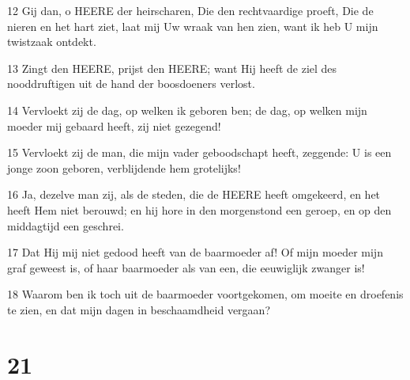 \par 12 Gij dan, o HEERE der heirscharen, Die den rechtvaardige proeft, Die de nieren en het hart ziet, laat mij Uw wraak van hen zien, want ik heb U mijn twistzaak ontdekt.
\par 13 Zingt den HEERE, prijst den HEERE; want Hij heeft de ziel des nooddruftigen uit de hand der boosdoeners verlost.
\par 14 Vervloekt zij de dag, op welken ik geboren ben; de dag, op welken mijn moeder mij gebaard heeft, zij niet gezegend!
\par 15 Vervloekt zij de man, die mijn vader geboodschapt heeft, zeggende: U is een jonge zoon geboren, verblijdende hem grotelijks!
\par 16 Ja, dezelve man zij, als de steden, die de HEERE heeft omgekeerd, en het heeft Hem niet berouwd; en hij hore in den morgenstond een geroep, en op den middagtijd een geschrei.
\par 17 Dat Hij mij niet gedood heeft van de baarmoeder af! Of mijn moeder mijn graf geweest is, of haar baarmoeder als van een, die eeuwiglijk zwanger is!
\par 18 Waarom ben ik toch uit de baarmoeder voortgekomen, om moeite en droefenis te zien, en dat mijn dagen in beschaamdheid vergaan?

\chapter{21}

